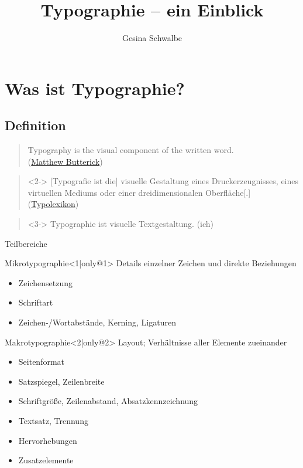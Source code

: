 \documentclass[ngerman,draft, usepdftitle=true]{beamer}
\title{Typographie – ein Einblick}
\author{Gesina Schwalbe}
\begin{document}
\maketitle
\tableofcontents[hideallsubsections]%


\section{Was ist Typographie?}
\frame{\sectionpage}
\subsection{Definition}
\begin{frame}
  \begin{quote}
    Typography is the visual component of the written word. \\
    (\href{http://practicaltypography.com/}{Matthew Butterick})
  \end{quote}
  \begin{quote}<2->
    [Typografie ist die] visuelle Gestaltung eines Druckerzeugnisses,
    eines virtuellen Mediums oder einer dreidimensionalen Oberfläche[.]\\
    (\href{http://www.typolexikon.de/typographie/}{Typolexikon})
  \end{quote}
  \begin{quote}<3->
    Typographie ist visuelle Textgestaltung. (ich)
  \end{quote}
\end{frame}

\begin{frame}[t]{Teilbereiche}
  \begin{block}{Mikrotypographie}<1|only@1>
    Details einzelner Zeichen und direkte Beziehungen
    \begin{itemize}
    \item Zeichensetzung
    \item Schriftart
    \item Zeichen-/Wortabstände, Kerning, Ligaturen
    \end{itemize}
  \end{block}
  \begin{block}{Makrotypographie}<2|only@2>
    Layout; Verhältnisse aller Elemente zueinander
    \begin{itemize}
    \item Seitenformat
    \item Satzspiegel, Zeilenbreite
    \item Schriftgröße, Zeilenabstand, Absatzkennzeichnung
    \item Textsatz, Trennung
    \item Hervorhebungen
    \item Zusatzelemente
    \end{itemize}
  \end{block}
\end{frame}
\end{document}
